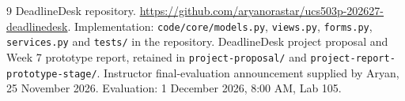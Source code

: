 \documentclass[11pt,a4paper]{article}
\begin{document}
\begin{thebibliography}{9}
 DeadlineDesk repository. \url{https://github.com/aryanorastar/ucs503p-202627-deadlinedesk}.
 Implementation: \nolinkurl{code/core/models.py}, \nolinkurl{views.py}, \nolinkurl{forms.py}, \nolinkurl{services.py} and \nolinkurl{tests/} in the repository.
 DeadlineDesk project proposal and Week 7 prototype report, retained in \nolinkurl{project-proposal/} and \nolinkurl{project-report-prototype-stage/}.
 Instructor final-evaluation announcement supplied by Aryan, 25 November 2026. Evaluation: 1 December 2026, 8:00 AM, Lab 105.
\end{thebibliography}
\end{document}
